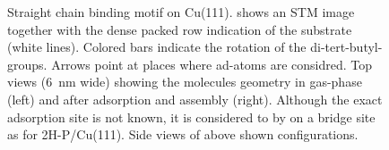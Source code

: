 \begin{figure}[h]
\begin{minipage}{0.45\textwidth}
{			\label{trans-nitro-on-cu111-70-shifted-chain-top-views}
		}
	\end{minipage}
	\caption{Straight chain binding motif on Cu(111).  shows an STM image together with the dense packed row indication of the substrate (white lines). Colored bars indicate the rotation of the di-tert-butyl-groups. Arrows point at places where ad-atoms are considred.
		 Top views (\SI{6}{\nano \meter} wide) showing the molecules geometry in gas-phase (left) and after adsorption and assembly (right). Although the exact adsorption site is not known, it is considered to by on a bridge site as for 2H-P/Cu(111).
		 Side views of above shown configurations.
	}
	\label{fig:two-leg-trans-cu111-motifs-1}
\end{figure}

